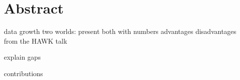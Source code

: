 \begingroup
\let\clearpage\relax
\let\cleardoublepage\relax
\let\cleardoublepage\relax

\chapter*{Abstract}
data growth
two worlds: present both with numbers
advantages disadvantages from the HAWK talk



explain gaps

contributions
\newpage
%

\endgroup			

